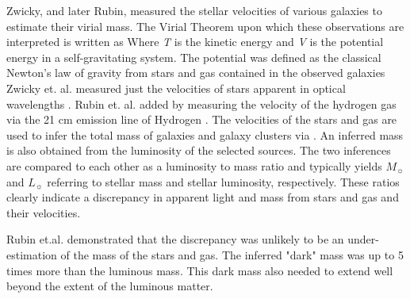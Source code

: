 Zwicky, and later Rubin, measured the stellar velocities of various galaxies to estimate their virial mass.
The Virial Theorem upon which these observations are interpreted is written as \virialtheorem
Where \textit{T} is the kinetic energy and \textit{V} is the potential energy in a self-gravitating system.
The potential was defined as the classical Newton's law of gravity from stars and gas contained in the observed galaxies \newtongravity
Zwicky et. al. measured just the velocities of stars apparent in optical wavelengths \cite{Zwicky:1933}.
Rubin et. al. added by measuring the velocity of the hydrogen gas via the 21 cm emission line of Hydrogen \cite{Rubin:1978}.
The velocities of the stars and gas are used to infer the total mass of galaxies and galaxy clusters via .
An inferred mass is also obtained from the luminosity of the selected sources.
The two inferences are compared to each other as a luminosity to mass ratio and typically yields \cite{Greene:cosmology_dm}\masslightratio
$M_{\sun}$ and $L_{\sun}$ referring to stellar mass and stellar luminosity, respectively.
These ratios clearly indicate a discrepancy in apparent light and mass from stars and gas and their velocities.

Rubin et.al. \cite{Rubin:1978} demonstrated that the discrepancy was unlikely to be an under-estimation of the mass of the stars and gas.
The inferred "dark" mass was up to 5 times more than the luminous mass.
This dark mass also needed to extend well beyond the extent of the luminous matter.

\begin{figure}[h]
\end{figure}

